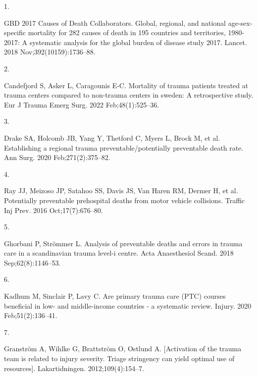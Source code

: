 \documentclass[
]{article}
\newlength{\cslhangindent}
\newlength{\csllabelwidth}
\newlength{\cslentryspacingunit} %
\newenvironment{CSLReferences}[2] %
 {%
  \setlength{\parindent}{0pt}
  \ifodd #1
  \let\oldpar\par
  \def\par{\hangindent=\cslhangindent\oldpar}
  \fi
  \setlength{\parskip}{#2\cslentryspacingunit}
 }%
 {}
\newcommand{\CSLLeftMargin}[1]{\parbox[t]{\csllabelwidth}{#1}}
\newcommand{\CSLRightInline}[1]{\parbox[t]{\linewidth - \csllabelwidth}{#1}\break}
\begin{document}
\hypertarget{refs}{}
\begin{CSLReferences}{0}{0}
\leavevmode{}%
\CSLLeftMargin{1. }
\CSLRightInline{GBD 2017 Causes of Death Collaborators. Global,
regional, and national age-sex-specific mortality for 282 causes of
death in 195 countries and territories, 1980-2017: A systematic analysis
for the global burden of disease study 2017. Lancet. 2018
Nov;392(10159):1736--88. }

\leavevmode{}%
\CSLLeftMargin{2. }
\CSLRightInline{Candefjord S, Asker L, Caragounis E-C. Mortality of
trauma patients treated at trauma centers compared to non-trauma centers
in sweden: A retrospective study. Eur J Trauma Emerg Surg. 2022
Feb;48(1):525--36. }

\leavevmode{}%
\CSLLeftMargin{3. }
\CSLRightInline{Drake SA, Holcomb JB, Yang Y, Thetford C, Myers L, Brock
M, et al. Establishing a regional trauma preventable/potentially
preventable death rate. Ann Surg. 2020 Feb;271(2):375--82. }

\leavevmode{}%
\CSLLeftMargin{4. }
\CSLRightInline{Ray JJ, Meizoso JP, Satahoo SS, Davis JS, Van Haren RM,
Dermer H, et al. Potentially preventable prehospital deaths from motor
vehicle collisions. Traffic Inj Prev. 2016 Oct;17(7):676--80. }

\leavevmode{}%
\CSLLeftMargin{5. }
\CSLRightInline{Ghorbani P, Strömmer L. Analysis of preventable deaths
and errors in trauma care in a scandinavian trauma level-i centre. Acta
Anaesthesiol Scand. 2018 Sep;62(8):1146--53. }

\leavevmode{}%
\CSLLeftMargin{6. }
\CSLRightInline{Kadhum M, Sinclair P, Lavy C. Are primary trauma care
({PTC}) courses beneficial in low- and middle-income countries - a
systematic review. Injury. 2020 Feb;51(2):136--41. }

\leavevmode{}%
\CSLLeftMargin{7. }
\CSLRightInline{Granström A, Wihlke G, Brattström O, Ostlund A.
{{[}{A}ctivation of the trauma team is related to injury severity.
{T}riage stringency can yield optimal use of resources{]}}.
Lakartidningen. 2012;109(4):154--7. }

\end{CSLReferences}
\end{document}

